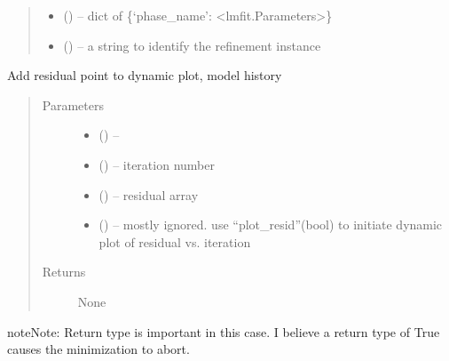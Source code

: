 \documentclass[letterpaper,10pt,english]{sphinxmanual}
\begin{document}
\begin{fulllineitems}
\begin{fulllineitems}
\begin{quote}
\begin{description}
\begin{itemize}
\item {} 
 (\sphinxstyleliteralemphasis{*}) -- dict of \{`phase\_name': \textless{}lmfit.Parameters\textgreater{}\}

\item {} 
 (\sphinxstyleliteralemphasis{*}) -- a string to identify the refinement instance

\end{itemize}

\end{description}\end{quote}

\end{fulllineitems}


\begin{fulllineitems}
\label{\detokenize{rst/refinement:mstack.refinement.Refinement.callback}}
Add residual point to dynamic plot, model history
\begin{quote}\begin{description}
\item[{Parameters}] \leavevmode\begin{itemize}
\item {} 
 () -- 

\item {} 
 () -- iteration number

\item {} 
 () -- residual array

\item {} 
 () -- mostly ignored. use ``plot\_resid''(bool) to initiate
dynamic plot of residual vs. iteration

\end{itemize}

\item[{Returns}] \leavevmode
None

\end{description}\end{quote}

\begin{sphinxadmonition}{note}{Note:}
Return type is important in this case. I believe a return type of
True causes the minimization to abort.
\end{sphinxadmonition}


\end{fulllineitems}
\end{fulllineitems}
\end{document}
